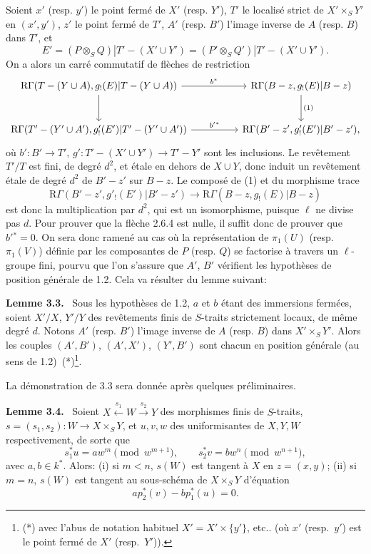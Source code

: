 \documentclass[11pt]{article}
\newenvironment{statement}[1]{\par\medskip\noindent\textbf{#1.}\ }{\par\medskip}
\newcommand{\R}{\mathrm{R}}\newcommand{\RHomCore}{\mathrm{RHom}}
\providecommand{\R}{\mathrm R}
\begin{document}
Soient $x'$ (resp. $y'$) le point fermé de $X'$ (resp. $Y'$), $T'$ le localisé strict de $X'\times_S Y'$ en $(x',y')$, $z'$ le point fermé de $T'$, $A'$ (resp. $B'$) l'image inverse de $A$ (resp. $B$) dans $T'$, et
\[
E'=(P\otimes_S Q)|T'-(X'\cup Y')
   =(P'\otimes_S Q')|T'-(X'\cup Y').
\]
On a alors un carré commutatif de flèches de restriction
\[
\begin{tikzcd}[column sep=huge,row sep=large]
\R\Gamma(T-(Y\cup A),g_!(E)|T-(Y\cup A))
 \arrow[r,"b^*"] \arrow[d]
&
\R\Gamma(B-z,g_!(E)|B-z) \arrow[d,"(1)"]\\
\R\Gamma(T'-(Y'\cup A'),g'_!(E')|T'-(Y'\cup A'))
 \arrow[r,"b'{}^*"]
&
\R\Gamma(B'-z',g'_!(E')|B'-z') ,
\end{tikzcd}
\]
où $b':B'\to T'$, $g':T'-(X'\cup Y')\to T'-Y'$ sont les inclusions. Le revêtement $T'/T$ est fini, de degré $d^2$, et étale en dehors de $X\cup Y$, donc induit un revêtement étale de degré $d^2$ de $B'-z'$ sur $B-z$. Le composé de (1) et du morphisme trace
\[
\R\Gamma(B'-z',g'_!(E')|B'-z')
 \longrightarrow
\R\Gamma(B-z,g_!(E)|B-z)
\]
est donc la multiplication par $d^2$, qui est un isomorphisme, puisque $\ell$ ne divise pas $d$. Pour prouver que la flèche 2.6.4 est nulle, il suffit donc de prouver que $b'{}^*=0$. On sera donc ramené au cas où la représentation de $\pi_1(U)$ (resp. $\pi_1(V)$) définie par les composantes de $P$ (resp. $Q$) se factorise à travers un $\ell$-groupe fini, pourvu que l'on s'assure que $A'$, $B'$ vérifient les hypothèses de position générale de 1.2. Cela va résulter du lemme suivant:

\begin{statement}{Lemme 3.3}
Sous les hypothèses de 1.2, $a$ et $b$ étant des immersions fermées, soient $X'/X$, $Y'/Y$ des revêtements finis de $S$-traits strictement locaux, de même degré $d$. Notons $A'$ (resp. $B'$) l'image inverse de $A$ (resp. $B$) dans $X'\times_S Y'$. Alors les couples $(A',B')$, $(A',X')$, $(Y',B')$ sont chacun en position générale (au sens de 1.2)~(*)\footnote{(*) avec l'abus de notation habituel $X'=X'\times\{y'\}$, etc.. (où $x'$ (resp.\ $y'$) est le point fermé de $X'$ (resp.\ $Y'$)).}.
\end{statement}

La démonstration de 3.3 sera donnée après quelques préliminaires.

\begin{statement}{Lemme 3.4}
Soient $X\xleftarrow{s_1}W\xrightarrow{s_2}Y$ des morphismes finis de $S$-traits, $s=(s_1,s_2):W\to X\times_SY$, et $u,v,w$ des uniformisantes de $X,Y,W$ respectivement, de sorte que
\[
s_1^*u=aw^m\pmod {w^{m+1}},\qquad
s_2^*v=bw^n\pmod {w^{n+1}},
\]
avec $a,b\in k^*$. Alors: (i) si $m<n$, $s(W)$ est tangent à $X$ en $z=(x,y)$; (ii) si $m=n$, $s(W)$ est tangent au sous-schéma de $X\times_SY$ d'équation
\[
ap_2^*(v)-bp_1^*(u)=0.
\]
\end{statement}
\end{document}
